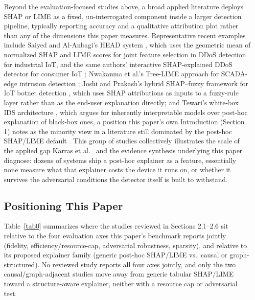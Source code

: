 Beyond the evaluation-focused studies above, a broad applied literature deploys SHAP or LIME as a fixed, un-interrogated component inside a larger detection pipeline, typically reporting accuracy and a qualitative attribution plot rather than any of the dimensions this paper measures. Representative recent examples include Saiyed and Al-Anbagi's HEAD system \citep{ref40}, which uses the geometric mean of normalized SHAP and LIME scores for joint feature selection in DDoS detection for industrial IoT, and the same authors' interactive SHAP-explained DDoS detector for consumer IoT \citep{ref41}; Nwakanma et al.'s Tree-LIME approach for SCADA-edge intrusion detection \citep{ref42}; Joshi and Prakash's hybrid SHAP--fuzzy framework for IoT botnet detection \citep{ref43}, which uses SHAP attributions as inputs to a fuzzy-rule layer rather than as the end-user explanation directly; and Tewari's white-box IDS architecture \citep{ref44}, which argues for inherently interpretable models over post-hoc explanation of black-box ones, a position this paper's own Introduction (Section 1) notes as the minority view in a literature still dominated by the post-hoc SHAP/LIME default \citep{ref1}. This group of studies collectively illustrates the scale of the applied gap Karras et al.~\citep{ref1} and the evidence synthesis underlying this paper \citep{ref7} diagnose: dozens of systems ship a post-hoc explainer as a feature, essentially none measure what that explainer costs the device it runs on, or whether it survives the adversarial conditions the detector itself is built to withstand.

\subsection{Positioning This Paper}\label{positioning-this-paper}

Table~\ref{tab0} summarizes where the studies reviewed in Sections 2.1--2.6 sit relative to the four evaluation axes this paper's benchmark reports jointly (fidelity, efficiency/resource-cap, adversarial robustness, sparsity), and relative to its proposed explainer family (generic post-hoc SHAP/LIME vs.~causal or graph-structured). No reviewed study reports all four axes jointly, and only the two causal/graph-adjacent studies \citep{ref30,ref31} move away from generic tabular SHAP/LIME toward a structure-aware explainer, neither with a resource cap or adversarial test.

